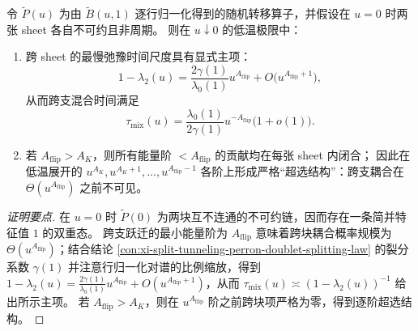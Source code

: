 \begin{conclusion}\label{con:xi-split-tunneling-superselection-arrhenius-exponent}
令 \(\widetilde P(u)\) 为由 \(\widetilde B(u,1)\) 逐行归一化得到的随机转移算子，并假设在 \(u=0\) 时两张 sheet 各自不可约且非周期。
则在 \(u\downarrow 0\) 的低温极限中：
\begin{enumerate}
  \item 跨 sheet 的最慢弛豫时间尺度具有显式主项：
  \[
  1-\lambda_2(u)=\frac{2\gamma(1)}{\lambda_0(1)}u^{A_{\mathrm{flip}}}+O\bigl(u^{A_{\mathrm{flip}}+1}\bigr),
  \]
  从而跨支混合时间满足
  \[
  \tau_{\mathrm{mix}}(u)=\frac{\lambda_0(1)}{2\gamma(1)}u^{-A_{\mathrm{flip}}}\bigl(1+o(1)\bigr).
  \]
  \item 若 \(A_{\mathrm{flip}}>A_K\)，则所有能量阶 \(<A_{\mathrm{flip}}\) 的贡献均在每张 sheet 内闭合；
  因此在低温展开的 \(u^{A_K},u^{A_K+1},\dots,u^{A_{\mathrm{flip}}-1}\) 各阶上形成严格“超选结构”：跨支耦合在 \(\Theta(u^{A_{\mathrm{flip}}})\) 之前不可见。
\end{enumerate}
\end{conclusion}
\begin{proof}[证明要点]
在 \(u=0\) 时 \(\widetilde P(0)\) 为两块互不连通的不可约链，因而存在一条简并特征值 \(1\) 的双重态。
跨支跃迁的最小能量阶为 \(A_{\mathrm{flip}}\) 意味着跨块耦合概率规模为 \(\Theta(u^{A_{\mathrm{flip}}})\)；结合结论 \ref{con:xi-split-tunneling-perron-doublet-splitting-law} 的裂分系数 \(\gamma(1)\) 并注意行归一化对谱的比例缩放，得到
\(
1-\lambda_2(u)=\frac{2\gamma(1)}{\lambda_0(1)}u^{A_{\mathrm{flip}}}+O(u^{A_{\mathrm{flip}}+1})
\)，从而 \(\tau_{\mathrm{mix}}(u)\asymp(1-\lambda_2(u))^{-1}\) 给出所示主项。
若 \(A_{\mathrm{flip}}>A_K\)，则在 \(u^{A_{\mathrm{flip}}}\) 阶之前跨块项严格为零，得到逐阶超选结构。
\end{proof}

